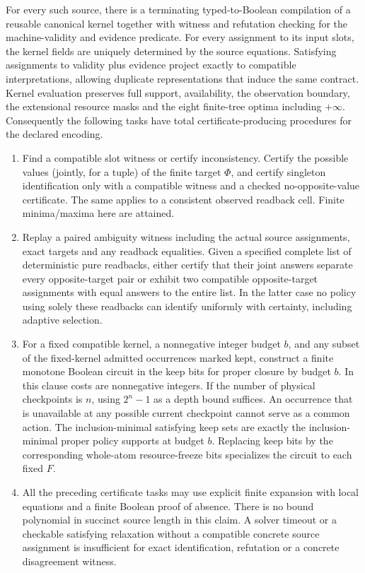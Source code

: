 \begin{theorem}
For every such source, there is a terminating typed-to-Boolean compilation of a reusable canonical kernel together with witness and refutation checking for the machine-validity and evidence predicate. For every assignment to its input slots, the kernel fields are uniquely determined by the source equations. Satisfying assignments to validity plus evidence project exactly to compatible interpretations, allowing duplicate representations that induce the same contract. Kernel evaluation preserves full support, availability, the observation boundary, the extensional resource masks and the eight finite-tree optima including \(+\infty\). Consequently the following tasks have total certificate-producing procedures for the declared encoding.

\begin{enumerate}
\def\labelenumi{\arabic{enumi}.}

\item
  Find a compatible slot witness or certify inconsistency. Certify the possible values (jointly, for a tuple) of the finite target \(\Phi\), and certify singleton identification only with a compatible witness and a checked no-opposite-value certificate. The same applies to a consistent observed readback cell. Finite minima/maxima here are attained.
\item
  Replay a paired ambiguity witness including the actual source assignments, exact targets and any readback equalities. Given a specified complete list of deterministic pure readbacks, either certify that their joint answers separate every opposite-target pair or exhibit two compatible opposite-target assignments with equal answers to the entire list. In the latter case no policy using solely these readbacks can identify uniformly with certainty, including adaptive selection.
\item
  For a fixed compatible kernel, a nonnegative integer budget \(b\), and any subset of the fixed-kernel admitted occurrences marked kept, construct a finite monotone Boolean circuit in the keep bits for proper closure by budget \(b\). In this clause costs are nonnegative integers. If the number of physical checkpoints is \(n\), using \(2^n-1\) as a depth bound suffices. An occurrence that is unavailable at any possible current checkpoint cannot serve as a common action. The inclusion-minimal satisfying keep sets are exactly the inclusion-minimal proper policy supports at budget \(b\). Replacing keep bits by the corresponding whole-atom resource-freeze bits specializes the circuit to each fixed \(F\).
\item
  All the preceding certificate tasks may use explicit finite expansion with local equations and a finite Boolean proof of absence. There is no bound polynomial in succinct source length in this claim. A solver timeout or a checkable satisfying relaxation without a compatible concrete source assignment is insufficient for exact identification, refutation or a concrete disagreement witness.
\end{enumerate}

\end{theorem}

